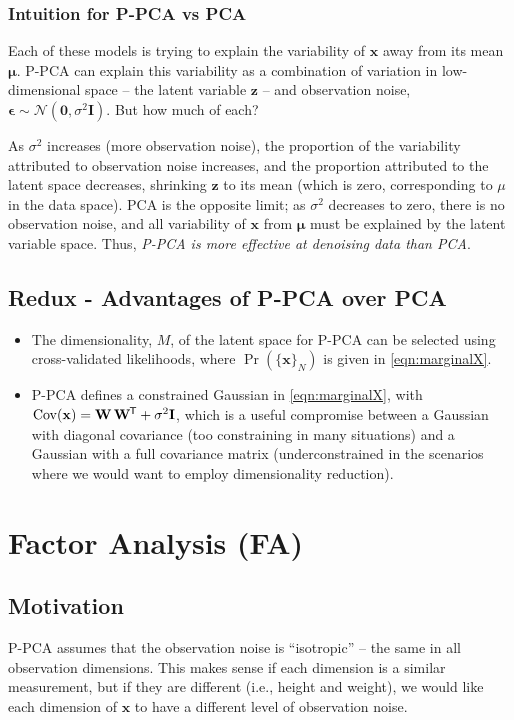 \documentclass[11pt]{article}
\DeclareMathOperator{\Cov}{Cov}
\newcommand{\xb}{\mathbf{x}}
\newcommand{\zb}{\mathbf{z}}
\newcommand{\ub}{\symbf{\mu}}
\newcommand{\Wb}{\mathbf{W}}
\newcommand*{\tran}{^{\mkern-1.5mu\mathsf{T}}}
\begin{document}
\subsubsection*{Intuition for P-PCA vs PCA}
Each of these models is trying to explain the variability of $\xb$ away from
its mean $\ub$. P-PCA can explain this variability as a combination of variation
in low-dimensional space -- the latent variable $\zb$ -- and observation noise,
$\symbf{\epsilon} \sim \mathcal{N}(\mathbf{0},\sigma^2 \mathbf{I})$. But how
much of each?

As $\sigma^2$ increases (more observation noise), the proportion of the
variability attributed to observation noise increases, and the proportion
attributed to the latent space decreases, shrinking $\zb$ to its mean (which
is zero, corresponding to $\mu$ in the data space). PCA is the opposite limit;
as $\sigma^2$ decreases to zero, there  is no observation noise, and all
variability of $\xb$ from $\ub$ must be explained by the latent variable space.
Thus, \textit{P-PCA is more effective at denoising data than PCA}.

\subsection{Redux - Advantages of P-PCA over PCA}
\begin{itemize}
  \item The dimensionality, $M$, of the latent space for P-PCA can be selected
  using cross-validated likelihoods, where $\Pr(\{\xb\}_N)$ is given in
  \eqref{eqn:marginalX}.

  \item P-PCA defines a constrained Gaussian in \eqref{eqn:marginalX}, with
  $\Cov(\xb) = \Wb\,\Wb\tran + \sigma^2 \mathbf{I}$, which is a useful
  compromise between a Gaussian with diagonal covariance (too constraining in
  many situations) and a Gaussian with a full covariance matrix
  (underconstrained in the scenarios where we would want to employ
  dimensionality reduction).
\end{itemize}

\section{Factor Analysis (FA)}
\subsection{Motivation}
P-PCA assumes that the observation noise is ``isotropic'' -- the same in all
observation dimensions. This makes sense if each dimension is a similar
measurement, but if they are different (i.e., height and weight), we would
like each dimension of $\xb$ to have a different level of observation noise.
\end{document}
